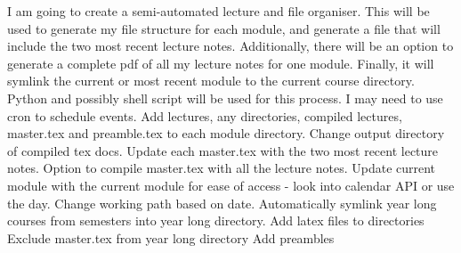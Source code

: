 \markdownRendererDocumentBegin
\markdownRendererJekyllDataBegin{}\markdownRendererJekyllDataMappingEnd\markdownRendererJekyllDataEnd\markdownRendererInterblockSeparator
{}\markdownRendererInterblockSeparator
{}I am going to create a semi-automated lecture and file organiser. \markdownRendererBackslash{} \markdownRendererBackslash{} This will be used to generate my file structure for each module, and generate a  file that will include the two most recent lecture notes. \markdownRendererBackslash{} \markdownRendererBackslash{} Additionally, there will be an option to generate a complete pdf of all my lecture notes for one module. \markdownRendererBackslash{} \markdownRendererBackslash{} Finally, it will symlink the current or most recent module to the current course directory. \markdownRendererBackslash{} \markdownRendererBackslash{} Python and possibly shell script will be used for this process. \markdownRendererBackslash{} \markdownRendererBackslash{} I may need to use cron to schedule events.\markdownRendererInterblockSeparator
{}\markdownRendererInterblockSeparator
{}\markdownRendererUlBeginTight
\markdownRendererUlItem Add lectures, any directories, compiled lectures, master.tex and preamble.tex to each module directory.\markdownRendererUlItemEnd 
\markdownRendererUlItem Change output directory of compiled tex docs.\markdownRendererUlItemEnd 
\markdownRendererUlItem Update each master.tex with the two most recent lecture notes.\markdownRendererUlItemEnd 
\markdownRendererUlItem Option to compile master.tex with all the lecture notes.\markdownRendererUlItemEnd 
\markdownRendererUlItem Update current module with the current module for ease of access - look into calendar API or use the day.\markdownRendererUlItemEnd 
\markdownRendererUlItem Change working path based on date.\markdownRendererUlItemEnd 
\markdownRendererUlItem Automatically symlink year long courses from semesters into year long directory.\markdownRendererUlItemEnd 
\markdownRendererUlEndTight \markdownRendererInterblockSeparator
{}\markdownRendererInterblockSeparator
{}\markdownRendererUlBeginTight
\markdownRendererUlItem Add latex files to directories\markdownRendererUlItemEnd 
\markdownRendererUlItem Exclude master.tex from year long directory\markdownRendererUlItemEnd 
\markdownRendererUlItem Add preambles\markdownRendererUlItemEnd 

